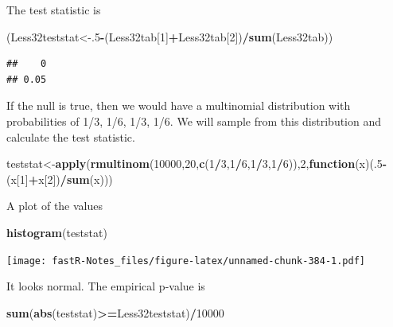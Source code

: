 \documentclass[]{book}
\newenvironment{Shaded}{\begin{snugshade}}{\end{snugshade}}
\newcommand{\KeywordTok}[1]{\textcolor[rgb]{0.13,0.29,0.53}{\textbf{#1}}}
\newcommand{\DecValTok}[1]{\textcolor[rgb]{0.00,0.00,0.81}{#1}}
\newcommand{\ControlFlowTok}[1]{\textcolor[rgb]{0.13,0.29,0.53}{\textbf{#1}}}
\newcommand{\OperatorTok}[1]{\textcolor[rgb]{0.81,0.36,0.00}{\textbf{#1}}}
\newcommand{\NormalTok}[1]{#1}
\theoremstyle{definition}
\theoremstyle{definition}
\theoremstyle{definition}
\theoremstyle{remark}
\begin{document}
The test statistic is

\begin{Shaded}
\begin{Highlighting}[]
\NormalTok{(Less32teststat<-.}\DecValTok{5}\OperatorTok{-}\NormalTok{(Less32tab[}\DecValTok{1}\NormalTok{]}\OperatorTok{+}\NormalTok{Less32tab[}\DecValTok{2}\NormalTok{])}\OperatorTok{/}\KeywordTok{sum}\NormalTok{(Less32tab))}
\end{Highlighting}
\end{Shaded}

\begin{verbatim}
##    0 
## 0.05
\end{verbatim}

If the null is true, then we would have a multinomial distribution with
probabilities of 1/3, 1/6, 1/3, 1/6. We will sample from this
distribution and calculate the test statistic.

\begin{Shaded}
\begin{Highlighting}[]
\NormalTok{teststat<-}\KeywordTok{apply}\NormalTok{(}\KeywordTok{rmultinom}\NormalTok{(}\DecValTok{10000}\NormalTok{,}\DecValTok{20}\NormalTok{,}\KeywordTok{c}\NormalTok{(}\DecValTok{1}\OperatorTok{/}\DecValTok{3}\NormalTok{,}\DecValTok{1}\OperatorTok{/}\DecValTok{6}\NormalTok{,}\DecValTok{1}\OperatorTok{/}\DecValTok{3}\NormalTok{,}\DecValTok{1}\OperatorTok{/}\DecValTok{6}\NormalTok{)),}\DecValTok{2}\NormalTok{,}\ControlFlowTok{function}\NormalTok{(x)(.}\DecValTok{5}\OperatorTok{-}\NormalTok{(x[}\DecValTok{1}\NormalTok{]}\OperatorTok{+}\NormalTok{x[}\DecValTok{2}\NormalTok{])}\OperatorTok{/}\KeywordTok{sum}\NormalTok{(x)))}
\end{Highlighting}
\end{Shaded}

A plot of the values

\begin{Shaded}
\begin{Highlighting}[]
\KeywordTok{histogram}\NormalTok{(teststat)}
\end{Highlighting}
\end{Shaded}

\texttt{[image: fastR-Notes\_files/figure-latex/unnamed-chunk-384-1.pdf]}

It looks normal. The empirical p-value is

\begin{Shaded}
\begin{Highlighting}[]
\KeywordTok{sum}\NormalTok{(}\KeywordTok{abs}\NormalTok{(teststat)}\OperatorTok{>=}\NormalTok{Less32teststat)}\OperatorTok{/}\DecValTok{10000}
\end{Highlighting}
\end{Shaded}
\end{document}
